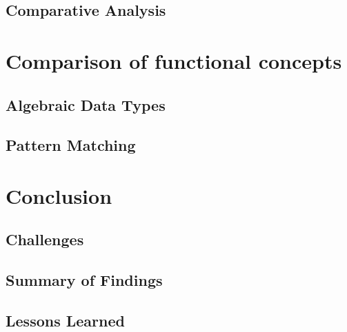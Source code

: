     \section{Comparative Analysis}\label{sec:comparative-analysis}


\chapter{Comparison of functional concepts}
    \section{Algebraic Data Types}\label{sec:algebraic-data-types}
    \section{Pattern Matching}\label{sec:pattern-matching}

\chapter{Conclusion}\label{chap:conclusion}
    \section{Challenges}\label{sec:challenges}
    \section{Summary of Findings}\label{sec:findings-summary}
    \section{Lessons Learned}\label{sec:lessons-learned}
